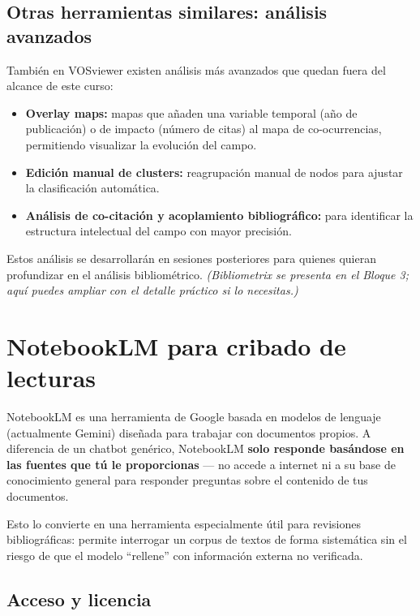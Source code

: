 \documentclass[
]{book}
\providecommand{\tightlist}{%
  \setlength{\itemsep}{0pt}\setlength{\parskip}{0pt}}
\begin{document}
\section{Otras herramientas similares: análisis avanzados}\label{otras-herramientas-similares-anuxe1lisis-avanzados}

También en VOSviewer existen análisis más avanzados que quedan fuera del alcance de este curso:

\begin{itemize}
\tightlist
\item
  \textbf{Overlay maps:} mapas que añaden una variable temporal (año de publicación) o de impacto (número de citas) al mapa de co-ocurrencias, permitiendo visualizar la evolución del campo.
\item
  \textbf{Edición manual de clusters:} reagrupación manual de nodos para ajustar la clasificación automática.
\item
  \textbf{Análisis de co-citación y acoplamiento bibliográfico:} para identificar la estructura intelectual del campo con mayor precisión.
\end{itemize}

Estos análisis se desarrollarán en sesiones posteriores para quienes quieran profundizar en el análisis bibliométrico. \emph{(Bibliometrix se presenta en el Bloque 3; aquí puedes ampliar con el detalle práctico si lo necesitas.)}

\chapter{NotebookLM para cribado de lecturas}\label{notebooklm}

NotebookLM es una herramienta de Google basada en modelos de lenguaje (actualmente Gemini) diseñada para trabajar con documentos propios. A diferencia de un chatbot genérico, NotebookLM \textbf{solo responde basándose en las fuentes que tú le proporcionas} --- no accede a internet ni a su base de conocimiento general para responder preguntas sobre el contenido de tus documentos.

Esto lo convierte en una herramienta especialmente útil para revisiones bibliográficas: permite interrogar un corpus de textos de forma sistemática sin el riesgo de que el modelo ``rellene'' con información externa no verificada.

\section{Acceso y licencia}\label{acceso-y-licencia}
\end{document}
